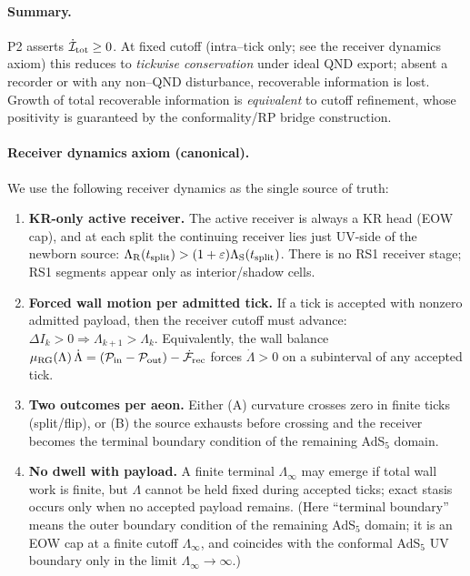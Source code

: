\documentclass[10pt]{article}
\theoremstyle{definition}
\theoremstyle{plain}
\begin{document}
\paragraph{Summary.}\label{par:uom-main-021}
P2 asserts $\dot{\mathcal I}_{\rm tot}\ge0$. At fixed cutoff (intra--tick only; see the
receiver dynamics axiom) this reduces to \emph{tickwise conservation} under ideal QND export;
absent a recorder or with any non–QND disturbance, recoverable information is lost. Growth
of total recoverable information is \emph{equivalent} to cutoff refinement, whose positivity
is guaranteed by the conformality/RP bridge construction.

\paragraph{Receiver dynamics axiom (canonical).}\label{par:uom-main-022}
We use the following receiver dynamics as the single source of truth:
\begin{enumerate}[label=(R\arabic*),leftmargin=2.0em,itemsep=2pt,topsep=2pt]
\item \textbf{KR-only active receiver.} The active receiver is always a KR head
(EOW cap), and at each split the continuing receiver lies just UV-side of the newborn source:
$\Lambda_{\rm R}(t_{\rm split})>(1+\varepsilon)\Lambda_{\rm S}(t_{\rm split})$.
There is no RS1 receiver stage; RS1 segments appear only as interior/shadow cells.
\item \textbf{Forced wall motion per admitted tick.} If a tick is accepted with nonzero
admitted payload, then the receiver cutoff must advance:
$\Delta I_k>0\Rightarrow \Lambda_{k+1}>\Lambda_k$. Equivalently, the wall balance
$\mu_{\rm RG}(\Lambda)\,\dot\Lambda=(\mathcal P_{\rm in}-\mathcal P_{\rm out})
-\dot{\mathcal F}_{\rm rec}$ forces $\dot\Lambda>0$ on a subinterval of any accepted tick.
\item \textbf{Two outcomes per aeon.} Either (A) curvature crosses zero in finite ticks
(split/flip), or (B) the source exhausts before crossing and the receiver becomes the
terminal boundary condition of the remaining AdS$_5$ domain.
\item \textbf{No dwell with payload.} A finite terminal $\Lambda_\infty$ may emerge if
total wall work is finite, but $\Lambda$ cannot be held fixed during accepted ticks;
exact stasis occurs only when no accepted payload remains. (Here “terminal boundary”
means the outer boundary condition of the remaining AdS$_5$ domain; it is an EOW cap at
a finite cutoff $\Lambda_\infty$, and coincides with the conformal AdS$_5$ UV boundary
only in the limit $\Lambda_\infty\to\infty$.)
\end{enumerate}
\end{document}

